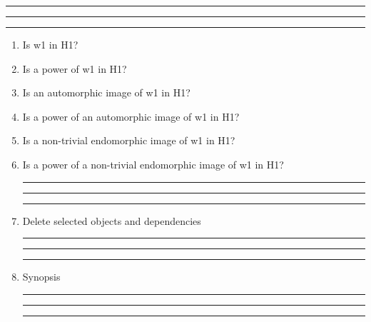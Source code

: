 
\bigskip
\hrule\hrule\hrule

\begin{enumerate}

\item Is w1 in H1?

\item Is a power of w1 in H1?

\item Is an automorphic image of w1 in H1?

\item Is a power of an automorphic image of w1 in H1?

\item Is a non-trivial endomorphic image of w1 in H1?

\item Is a power of a non-trivial endomorphic image of w1 in H1?

\bigskip
\hrule\hrule\hrule

\item Delete selected objects and dependencies

\bigskip
\hrule\hrule\hrule

\item
Synopsis

\bigskip
\hrule\hrule\hrule

\end{enumerate}

